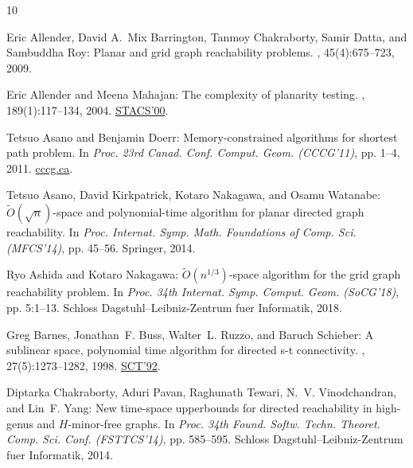 \documentclass[11pt]{article}
\numberwithin{equation}{section}
\theoremstyle{definition}
\theoremstyle{plain}
\begin{document}
\tocrefpdfbookmark
\begin{thebibliography}{10}

{\sc Eric Allender, David A.~Mix Barrington, Tanmoy Chakraborty, Samir Datta,
  and Sambuddha Roy}: Planar and grid graph reachability problems.
, 45(4):675--723, 2009.
\newblock [\epfmtdoi{10.1007/s00224-009-9172-z}]

{\sc Eric Allender and Meena Mahajan}: The complexity of planarity testing.
, 189(1):117--134, 2004.
\newblock \prelim \href{https://doi.org/10.1007/3-540-46541-3\_7}{STACS'00}.
\newblock [\epfmtdoi{10.1016/j.ic.2003.09.002}]

{\sc Tetsuo Asano and Benjamin Doerr}: Memory-constrained algorithms for
  shortest path problem.
\newblock In {\em Proc. 23rd Canad. Conf. Comput. Geom. (CCCG'11)}, pp. 1--4,
  2011.
\newblock
  \href{http://www.cccg.ca/proceedings/2011/papers/paper15.pdf}{cccg.ca}.

{\sc Tetsuo Asano, David Kirkpatrick, Kotaro Nakagawa, and Osamu Watanabe}:
  $\tilde{O}(\sqrt{n})$-space and polynomial-time algorithm for planar directed
  graph reachability.
\newblock In {\em Proc. Internat. Symp. Math. Foundations of Comp. Sci.
  (MFCS'14)}, pp. 45--56. Springer, 2014.

{\sc Ryo Ashida and Kotaro Nakagawa}: $\tilde{O}(n^{1/3})$-space algorithm for
  the grid graph reachability problem.
\newblock In {\em Proc. 34th Internat. Symp. Comput. Geom. (SoCG'18)}, pp.
  5:1--13. Schloss Dagstuhl--Leibniz-Zentrum fuer Informatik, 2018.

{\sc Greg Barnes, Jonathan~F. Buss, Walter~L. Ruzzo, and Baruch Schieber}: A
  sublinear space, polynomial time algorithm for directed s-t connectivity.
, 27(5):1273--1282, 1998.
\newblock \prelim \href{https://doi.org/10.1109/SCT.1992.215378}{SCT'92}.
\newblock [\epfmtdoi{10.1137/S0097539793283151}]

{\sc Diptarka Chakraborty, Aduri Pavan, Raghunath Tewari, N.~V. Vinodchandran,
  and Lin~F. Yang}: New time-space upperbounds for directed reachability in
  high-genus and {$H$}-minor-free graphs.
\newblock In {\em Proc. 34th Found. Softw. Techn. Theoret. Comp. Sci. Conf.
  (FSTTCS'14)}, pp. 585--595. Schloss Dagstuhl--Leibniz-Zentrum fuer
  Informatik, 2014.


\end{thebibliography}
\end{document}
